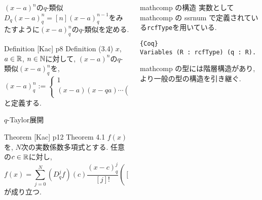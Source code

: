 \documentclass[unicode,mathserif]{beamer}
\begin{document}
\begin{frame}[fragile]
\begin{columns}[T]
\begin{column}{0.33\columnwidth}
		\begin{block}{$(x - a)^n$の$q$-類似}
			$D_q(x-a)^n_q = [n](x-a)^{n-1}_q$をみたすように$(x - a)^n_q$の$q$-類似を定める. 
			\begin{itembox}{Definition [Kac] p8 Definition (3.4)}
			$x$, $a \in \mathbb R$, $n \in \mathbb N$に対して, $(x - a)^n$の$q$-類似$(x - a)^n_q$を, 
			\[
				(x - a)^n_q := \begin{cases}
					1 & \text{if}\ n = 0 \\
					(x - a) (x - qa) \cdots (x - q^{n - 1} a) & \text{if}\ n \ge 1
				\end{cases}
			\]
			と定義する.
			\end{itembox}
		\end{block}
		
		\begin{block}{$q$-Taylor展開}
			\begin{itembox}{Theorem [Kac] p12 Theorem 4.1}
				$f(x)$を, $N$次の実数係数多項式とする. 任意の$c\in\mathbb R$に対し, 
				\[
					f(x) = \sum_{j=0}^N (D_q^jf)(c)\frac{(x-c)^j_q}{[j]!}
						\left( [n]! := \begin{cases}
													1 & (n=0)\\
													[n]\times[n-1]\times\cdots\times[1] & (n\ge1)
												\end{cases}
						\right)
				\]
				が成り立つ.
			\end{itembox}
		\end{block}
	\end{column}

	\begin{column}{0.33\columnwidth}
		\begin{block}{mathcomp の構造}
			実数として mathcomp の ssrnum で定義されている{\tt rcfType}を用いている. 
			\begin{lstlisting}{Coq}
Variables (R : rcfType) (q : R). \end{lstlisting}			
			mathcomp の型には階層構造があり, より一般の型の構造を引き継ぐ. 
			

\end{block}
\end{column}
\end{columns}
\end{frame}
\end{document}

